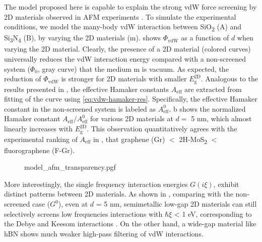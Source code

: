 The model proposed here is capable to explain the
strong vdW force screening by 2D materials observed in AFM experiments
\cite{Tsoi_2014}.
%
To simulate the experimental conditions, we model the
many-body vdW interaction between SiO\textsubscript{2} (A) and Si\textsubscript{3}N\textsubscript{4} (B), by
varying the 2D materials (m).
 shows \(\Phi_{\mathrm{vdW}}\) as a function of
\(d\) when varying the 2D material.
%
Clearly, the presence of a 2D material (colored curves) universally
reduces the vdW interaction energy compared with a non-screened system
(\(\Phi_{0}\), gray curve) that the medium m is vacuum.
%
As expected, the reduction of $\Phi_{\mathrm{vdW}}$ is stronger for 2D
materials with smaller \(E_{\mathrm{g}}^{\mathrm{2D}}\).
%
Analogous to the results presented in
\cite{Tsoi_2014_vdW_screening_2D}, the effective Hamaker constants
\(A_{\mathrm{eff}}\) are extracted from fitting of the curve using
\autoref{eq:vdw-hamaker-res}. 
%
Specifically, the effective Hamaker constant in the non-screened system is labeled as $A_{\mathrm{eff}}^{0}$.
%
b shows the normalized Hamaker constant
$A_{\mathrm{eff}} / A_{\mathrm{eff}}^{0}$ for various 2D materials at
$d=$ 5 nm, which almost linearly increases
with \(E_{\mathrm{g}}^{\mathrm{2D}}\).
%
This
observation quantitatively agrees with the experimental ranking of
\(A_{\mathrm{eff}}\) in \cite{Tsoi_2014_vdW_screening_2D}, that graphene (Gr) $<$ 2H-MoS\textsubscript{2} $<$ fluoro\-graphene (F-Gr).
\begin{figure}[h]
  \centering{}
  {model_afm_transparency.pgf}
  \caption{\label{fig:vdw-afm-model}}
\end{figure}

%
More interestingly, the single frequency interaction energies
\(G(i\xi)\), exhibit distinct patterns between 2D materials. As shown
in , comparing with the non-screened case
($G^{0}$), even at \(d\) = 5 nm, semi\-metallic low-gap 2D materials
can still selectively screens low frequencies interactions with
\(\hbar\xi\) \textless{} 1 eV, corresponding to the Debye and Keesom
interactions \cite{israelachvili_intermolecular_2011}.
%
On the other hand, a wide-gap material like hBN shows much weaker high-pass filtering of vdW interactions.
%

